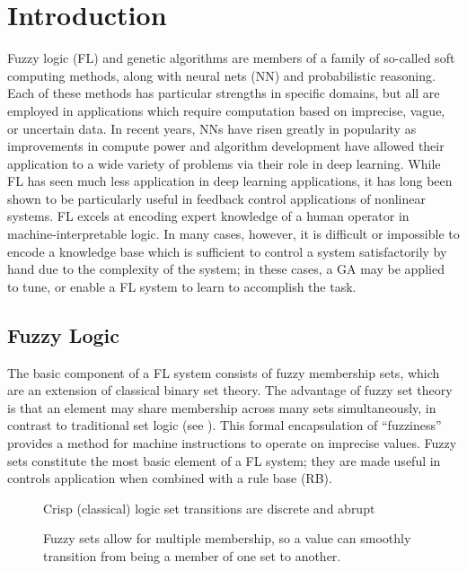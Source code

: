 \chapter{Introduction} Fuzzy logic (FL) and genetic algorithms are members of a family of so-called soft
computing methods, along with neural nets (NN) and probabilistic reasoning\cite{cordon:01bk}. Each of these
methods has particular strengths in specific domains, but all are employed in applications which require
computation based on imprecise, vague, or uncertain data. In recent years, NNs have risen greatly in
popularity as improvements in compute power and algorithm development have allowed their application to a wide
variety of problems via their role in deep learning\cite{Goodfellow-et-al-2016}. While FL has seen much less
application in deep learning applications, it has long been shown to be particularly useful in feedback
control applications of nonlinear systems\cite{MAMDANI19751}. FL excels at encoding expert knowledge of a
human operator in machine-interpretable logic. In many cases, however, it is difficult or impossible to encode
a knowledge base which is sufficient to control a system satisfactorily by hand due to the complexity of the
system; in these cases, a GA may be applied to tune, or enable a FL system to learn to accomplish the task.

\section{Fuzzy Logic}
The basic component of a FL system consists of fuzzy membership sets\cite{ZADEH1965338}, which are an
extension of classical binary set theory. The advantage of fuzzy set theory is that an element may share
membership across many sets simultaneously, in contrast to traditional set logic (see
). This formal encapsulation of ``fuzziness'' provides a method for
machine instructions to operate on imprecise values. Fuzzy sets constitute the most basic element of a FL
system; they are made useful in controls application when combined with a rule base (RB).

\begin{figure}[ht]
    \centering
    
    \caption{Crisp (classical) logic set transitions are discrete and abrupt}\label{f:crispsets}
\end{figure}

\begin{figure}[ht]
    \centering
    
    \caption{Fuzzy sets allow for multiple membership, so a value can smoothly transition from being a member
    of one set to another.}\label{f:fuzzysets}
\end{figure}

